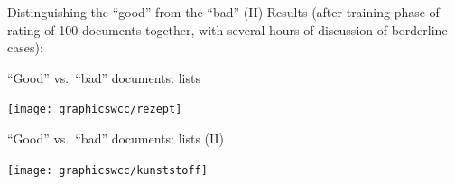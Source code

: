\begin{frame}
{Distinguishing the ``good'' from the ``bad'' (II)}
Results (after training phase of rating of 100 documents together, with several hours of discussion of borderline cases):


  \begin{center}
  \end{center}

\end{frame}




\begin{frame}{``Good'' vs.\ ``bad'' documents: lists}

   \begin{center}
    \texttt{[image: graphicswcc/rezept]}
  \end{center}

\end{frame}



\begin{frame}{``Good'' vs.\ ``bad'' documents: lists (II)}

   \begin{center}
    \texttt{[image: graphicswcc/kunststoff]}
  \end{center}

\end{frame}


